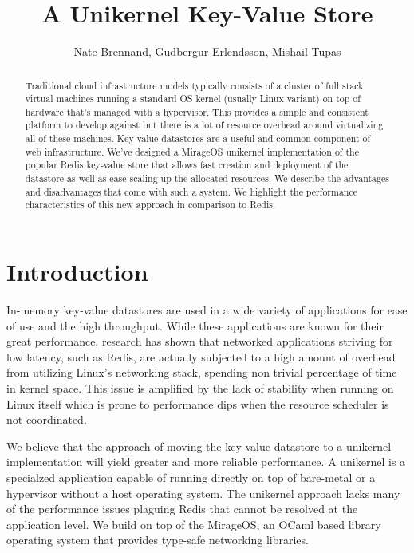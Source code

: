 \documentclass[english,10pt,twocolumn]{article}
\begin{document}
\title{A Unikernel Key-Value Store}
\author{Nate Brennand, Gudbergur Erlendsson, Mishail Tupas}
\date{}
\maketitle
\thispagestyle{empty}

\begin{abstract}
  Traditional cloud infrastructure models typically consists of a cluster of full stack virtual machines running a standard OS kernel (usually Linux variant) on top of hardware that's managed with a hypervisor.
  This provides a simple and consistent platform to develop against but there is a lot of resource overhead around virtualizing all of these machines.
  Key-value datastores are a useful and common component of web infrastructure.
  We've designed a MirageOS\cite{mirage} unikernel implementation of the popular Redis\cite{redis} key-value store that allows fast creation and deployment of the datastore as well as ease scaling up the allocated resources.
  We describe the advantages and disadvantages that come with such a system.
  We highlight the performance characteristics of this new approach in comparison to Redis.
\end{abstract}

\section{Introduction}
In-memory key-value datastores are used in a wide variety of applications for ease of use and the high throughput.
While these applications are known for their great performance, research has shown that networked applications striving for low latency, such as Redis, are actually subjected to a high amount of overhead from utilizing Linux's networking stack, spending non trivial percentage of time in kernel space.\cite{arrakis}
This issue is amplified by the lack of stability when running on Linux itself which is prone to performance dips when the resource scheduler is not coordinated.

We believe that the approach of moving the key-value datastore to a unikernel implementation will yield greater and more reliable performance.
A unikernel is a specialzed application capable of running directly on top of bare-metal or a hypervisor without a host operating system.
The unikernel approach lacks many of the performance issues plaguing Redis that cannot be resolved at the application level.
We build on top of the MirageOS\cite{mirage}, an OCaml based library operating system that provides type-safe networking libraries.
\end{document}
